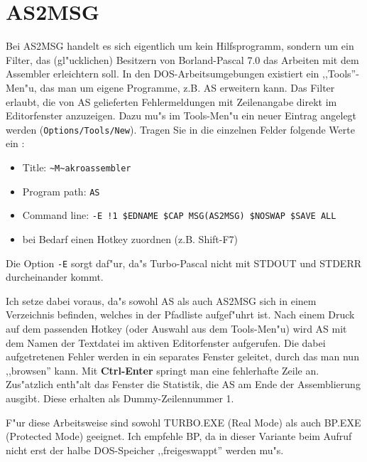 \documentclass[12pt,a4paper,twoside]{report}
\newcommand{\bb}[1]{{\bf #1}}
\newcommand{\tty}[1]{{\tt #1}}
\newcommand{\asname}{AS}
\begin{document}

\section{AS2MSG}

Bei AS2MSG handelt es sich eigentlich um kein Hilfsprogramm, sondern um ein
Filter, das (gl"ucklichen) Besitzern von Borland-Pascal 7.0 das Arbeiten
mit dem Assembler erleichtern soll.  In den DOS-Arbeitsumgebungen existiert
ein ,,Tools''-Men"u, das man um eigene Programme, z.B. \asname{} erweitern kann.
Das Filter erlaubt, die von \asname{} gelieferten Fehlermeldungen mit Zeilenangabe
direkt im Editorfenster anzuzeigen.  Dazu mu"s im Tools-Men"u ein neuer
Eintrag angelegt werden (\tty{Options/Tools/New}).  Tragen Sie in die
einzelnen Felder folgende Werte ein :
\begin{itemize}
\item{Title: {\tt \verb!~!M\verb!~!akroassembler}}
\item{Program path: \tty{\asname{}}}
\item{Command line: \tty{-E !1 \$EDNAME \$CAP MSG(AS2MSG) \$NOSWAP \$SAVE
ALL}}
\item{bei Bedarf einen Hotkey zuordnen (z.B. Shift-F7)}
\end{itemize}
Die Option \tty{-E} sorgt daf"ur, da"s Turbo-Pascal nicht mit STDOUT und
STDERR durcheinander kommt.
\par
Ich setze dabei voraus, da"s sowohl \asname{} als auch AS2MSG sich in einem
Verzeichnis befinden, welches in der Pfadliste aufgef"uhrt ist.  Nach einem
Druck auf dem passenden Hotkey (oder Auswahl aus dem Tools-Men"u) wird \asname{} mit
dem Namen der Textdatei im aktiven Editorfenster aufgerufen.  Die dabei
aufgetretenen Fehler werden in ein separates Fenster geleitet, durch das man
nun ,,browsen'' kann.  Mit \bb{Ctrl-Enter} springt man eine fehlerhafte
Zeile an.  Zus"atzlich enth"alt das Fenster die Statistik, die \asname{} am Ende
der Assemblierung ausgibt.  Diese erhalten als Dummy-Zeilennummer 1.
\par
F"ur diese Arbeitsweise sind sowohl TURBO.EXE (Real Mode) als auch BP.EXE
(Protected Mode) geeignet.  Ich empfehle BP, da in dieser Variante beim
Aufruf nicht erst der halbe DOS-Speicher ,,freigeswappt'' werden mu"s.

\cleardoublepage

\appendix

\end{document}
